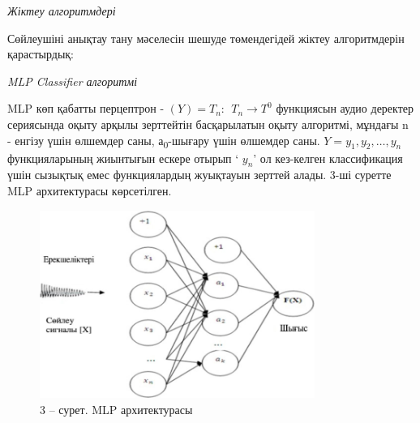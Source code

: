 \begin{multicols}{2}
\emph{Жіктеу алгоритмдері}

Сөйлеушіні анықтау тану мәселесін шешуде төмендегідей жіктеу
алгоритмдерін қарастырдық:

\emph{MLP Classifier алгоритмі}

MLP көп қабатты перцептрон -
\((Y) = T_{n}:{\ \ T}_{n} \rightarrow T^{0}\) функциясын аудио деректер
сериясында оқыту арқылы зерттейтін басқарылатын оқыту алгоритмі, мұндағы
n - енгізу үшін өлшемдер саны, а\textsubscript{0}-шығару үшін өлшемдер
саны. \(Y = y_{1},y_{2},\ldots,y_{n}\) функцияларының жиынтығын ескере
отырып ` \(y_{n}\)' ол кез-келген классификация үшін сызықтық емес
функциялардың жуықтауын зерттей алады. 3-ші суретте MLP архитектурасы
көрсетілген.
\end{multicols}

\begin{figure}[H]
	\centering
	\includegraphics[width=0.8\textwidth]{media/ict/image7}
	\caption*{3 – сурет. MLP архитектурасы}
\end{figure}

